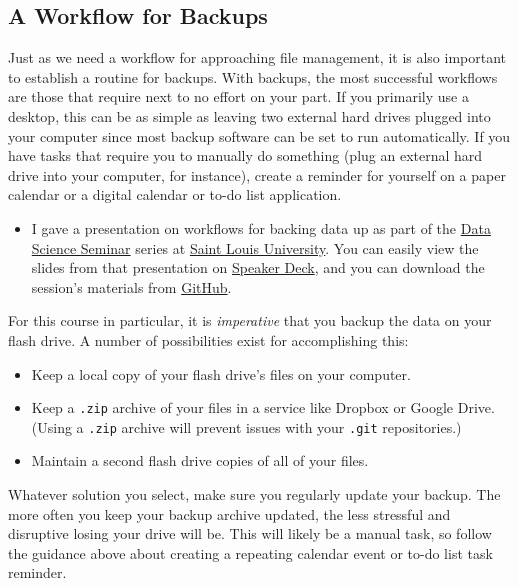 \documentclass[]{book}
\providecommand{\tightlist}{%
  \setlength{\itemsep}{0pt}\setlength{\parskip}{0pt}}
\newenvironment{rmdblock}[1]
  {\begin{shaded*}
  \begin{itemize}
  \renewcommand{\labelitemi}{
    \raisebox{-.7\height}[0pt][0pt]{
      {\setkeys{Gin}{width=3em,keepaspectratio}\texttt{[image: images/\#1]}}
    }
  }
  \item
  }
  {
  \end{itemize}
  \end{shaded*}
  }
\newenvironment{rmdtip}
  {\begin{rmdblock}{tip}}
  {\end{rmdblock}}
\theoremstyle{definition}
\theoremstyle{definition}
\theoremstyle{definition}
\theoremstyle{remark}
\begin{document}
\subsection{A Workflow for Backups}\label{a-workflow-for-backups}

Just as we need a workflow for approaching file management, it is also
important to establish a routine for backups. With backups, the most
successful workflows are those that require next to no effort on your
part. If you primarily use a desktop, this can be as simple as leaving
two external hard drives plugged into your computer since most backup
software can be set to run automatically. If you have tasks that require
you to manually do something (plug an external hard drive into your
computer, for instance), create a reminder for yourself on a paper
calendar or a digital calendar or to-do list application.

\begin{rmdtip}
I gave a presentation on workflows for backing data up as part of the
\href{https://slu-dss.github.io}{Data Science Seminar} series at
\href{https://slu.edu}{Saint Louis University}. You can easily view the
slides from that presentation on
\href{https://speakerdeck.com/chrisprener/protecting-your-data}{Speaker
Deck}, and you can download the session's materials from
\href{https://github.com/slu-dss/protectData}{GitHub}.
\end{rmdtip}

For this course in particular, it is \emph{imperative} that you backup
the data on your flash drive. A number of possibilities exist for
accomplishing this:

\begin{itemize}
\tightlist
\item
  Keep a local copy of your flash drive's files on your computer.
\item
  Keep a \texttt{.zip} archive of your files in a service like Dropbox
  or Google Drive. (Using a \texttt{.zip} archive will prevent issues
  with your \texttt{.git} repositories.)
\item
  Maintain a second flash drive copies of all of your files.
\end{itemize}

Whatever solution you select, make sure you regularly update your
backup. The more often you keep your backup archive updated, the less
stressful and disruptive losing your drive will be. This will likely be
a manual task, so follow the guidance above about creating a repeating
calendar event or to-do list task reminder.
\end{document}
